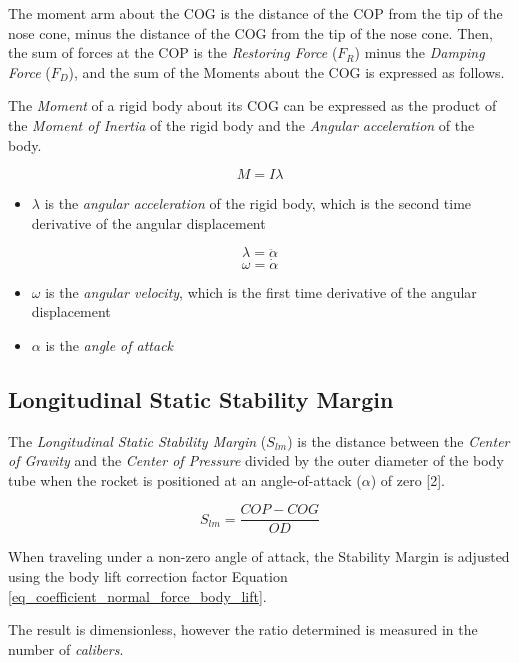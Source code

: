 \documentclass[]{article}
\providecommand{\tightlist}{%
  \setlength{\itemsep}{0pt}\setlength{\parskip}{0pt}}
\begin{document}
The moment arm about the COG is the distance of the COP from the tip of
the nose cone, minus the distance of the COG from the tip of the nose
cone. Then, the sum of forces at the COP is the \emph{Restoring Force}
(\(F_R\)) minus the \emph{Damping Force} (\(F_D\)), and the sum of the
Moments about the COG is expressed as follows.

The \emph{Moment} of a rigid body about its COG can be expressed as the
product of the \emph{Moment of Inertia} of the rigid body and the
\emph{Angular acceleration} of the body.

\begin{equation}
\label{eq_moment}
M = I \lambda 
\end{equation}

\begin{itemize}
\tightlist
\item
  \(\lambda\) is the \emph{angular acceleration} of the rigid body,
  which is the second time derivative of the angular displacement
\end{itemize}

\[ 
\lambda = \ddot{\alpha}
\] \[
\omega = \dot{\alpha}
\]

\begin{itemize}
\tightlist
\item
  \(\omega\) is the \emph{angular velocity}, which is the first time
  derivative of the angular displacement
\item
  \(\alpha\) is the \emph{angle of attack}
\end{itemize}

\subsection{Longitudinal Static Stability
Margin}\label{longitudinal-static-stability-margin}

The \emph{Longitudinal Static Stability Margin} (\(S_{lm}\)) is the
distance between the \emph{Center of Gravity} and the \emph{Center of
Pressure} divided by the outer diameter of the body tube when the rocket
is positioned at an angle-of-attack (\(\alpha\)) of zero {[}2{]}.

\[ S_{lm} = \dfrac{COP - COG}{OD} \]

When traveling under a non-zero angle of attack, the Stability Margin is
adjusted using the body lift correction factor Equation
\ref{eq_coefficient_normal_force_body_lift}.

The result is dimensionless, however the ratio determined is measured in
the number of \emph{calibers}.
\end{document}
